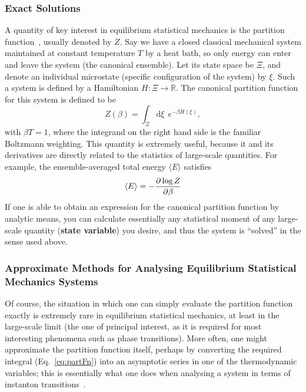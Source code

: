 \subsubsection{Exact Solutions}
A quantity of key interest in equilibrium statistical mechanics is the partition
function~\cite{martynovStatmech}, usually denoted by $Z$. Say we have a closed classical mechanical system maintained at constant temperature $T$ by a heat bath,
so only energy can enter and leave the system (the canonical ensemble). Let its state space be $\Xi$, and denote an individual microstate (specific configuration of the system) by $\xi$.
Such a system is defined by a Hamiltonian $H : \Xi \rightarrow \mathbb{R}$. The canonical partition function for this system is defined to be
\begin{equation} \label{eq:partFn}
 Z(\beta) = \int_\Xi  \! \! \mathrm{d}  \xi \  \  e^{- \beta H(\xi)},
\end{equation}
with $\beta T = 1$, where the integrand on the right hand side is the familiar Boltzmann weighting. This quantity is extremely useful, because it and its derivatives are directly related to the statistics of large-scale quantities.
For example, the ensemble-averaged total energy $\langle E \rangle$ satisfies
\begin{equation}
 \langle E \rangle = - \frac{\partial \log{Z}}{\partial \beta}
\end{equation}
If one is able to obtain an expression for the canonical partition function by analytic means, you can calculate essentially any statistical moment of any large-scale quantity (\textbf{state variable})
you desire, and thus the system is ``solved'' in the sense used above.



\subsubsection{Approximate Methods for Analysing Equilibrium Statistical Mechanics Systems}
Of course, the situation in which one can simply evaluate the partition function exactly is
extremely rare in equilibrium statistical mechanics, at least in the large-scale limit (the one of
principal interest, as it is required for most interesting phenomena such as phase transitions).
More often, one might approximate the partition function itself, perhaps by converting the required
integral (Eq.~\eqref{eq:partFn}) into an asymptotic series in one of the thermodynamic variables;
this is essentially what one does when analysing a system in terms of instanton transitions~\cite{grafke2015}.

